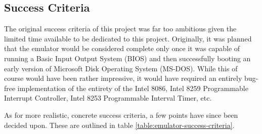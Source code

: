 \subsection{Success Criteria}
    The original success criteria of this project was far too ambitious given the limited time available to be dedicated to this project. Originally, it was planned that the emulator would be considered complete only once it was capable of running a Basic Input Output System (BIOS) and then successfully booting an early version of Microsoft Disk Operating System (MS-DOS). While this of course would have been rather impressive, it would have required an entirely bug-free implementation of the entirety of the Intel 8086, Intel 8259 Programmable Interrupt Controller, Intel 8253 Programmable Interval Timer, etc.

    As for more realistic, concrete success criteria, a few points have since been decided upon. These are outlined in table \ref{table:emulator-success-criteria}.%

